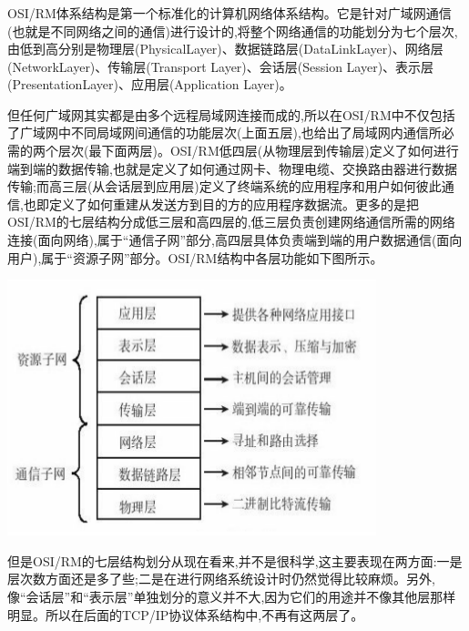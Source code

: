 \documentclass[11pt]{ctexart} %
\begin{document}
\subsubsection*{}
\paragraph{}
 OSI/RM体系结构是第一个标准化的计算机网络体系结构。它是针对广域网通信(也就是不同网络之间的通信)进行设计的,将整个网络通信的功能划分为七个层次,由低到高分别是物理层(PhysicalLayer)、数据链路层(DataLinkLayer)、网络层(NetworkLayer)、传输层(Transport Layer)、会话层(Session Layer)、表示层(PresentationLayer)、应用层(Application Layer)。
 
 但任何广域网其实都是由多个远程局域网连接而成的,所以在OSI/RM中不仅包括了广域网中不同局域网间通信的功能层次(上面五层),也给出了局域网内通信所必需的两个层次(最下面两层)。OSI/RM低四层(从物理层到传输层)定义了如何进行端到端的数据传输,也就是定义了如何通过网卡、物理电缆、交换路由器进行数据传输;而高三层(从会话层到应用层)定义了终端系统的应用程序和用户如何彼此通信,也即定义了如何重建从发送方到目的方的应用程序数据流。更多的是把OSI/RM的七层结构分成低三层和高四层的,低三层负责创建网络通信所需的网络连接(面向网络),属于“通信子网”部分,高四层具体负责端到端的用户数据通信(面向用户),属于“资源子网”部分。OSI/RM结构中各层功能如下图所示。
 
\includegraphics[width=0.7\linewidth]{OSI-RM}

但是OSI/RM的七层结构划分从现在看来,并不是很科学,这主要表现在两方面:一是层次数方面还是多了些;二是在进行网络系统设计时仍然觉得比较麻烦。另外,像“会话层”和“表示层”单独划分的意义并不大,因为它们的用途并不像其他层那样明显。所以在后面的TCP/IP协议体系结构中,不再有这两层了。

\subsubsection*{}
\end{document}
